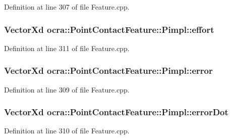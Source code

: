 Definition at line 307 of file Feature.\+cpp.

\subsubsection[{\texorpdfstring{effort}{effort}}]{\setlength{\rightskip}{0pt plus 5cm}Vector\+Xd ocra\+::\+Point\+Contact\+Feature\+::\+Pimpl\+::effort}\hypertarget{structocra_1_1PointContactFeature_1_1Pimpl_ad35d11a459c7be6bae5fe8005c734ffa}{}\label{structocra_1_1PointContactFeature_1_1Pimpl_ad35d11a459c7be6bae5fe8005c734ffa}


Definition at line 311 of file Feature.\+cpp.

\subsubsection[{\texorpdfstring{error}{error}}]{\setlength{\rightskip}{0pt plus 5cm}Vector\+Xd ocra\+::\+Point\+Contact\+Feature\+::\+Pimpl\+::error}\hypertarget{structocra_1_1PointContactFeature_1_1Pimpl_aabf12f72f637db8c9fac8208f513ab48}{}\label{structocra_1_1PointContactFeature_1_1Pimpl_aabf12f72f637db8c9fac8208f513ab48}


Definition at line 309 of file Feature.\+cpp.

\subsubsection[{\texorpdfstring{error\+Dot}{errorDot}}]{\setlength{\rightskip}{0pt plus 5cm}Vector\+Xd ocra\+::\+Point\+Contact\+Feature\+::\+Pimpl\+::error\+Dot}\hypertarget{structocra_1_1PointContactFeature_1_1Pimpl_a9dc4c6e3ed1c44c57bf5543197eaca17}{}\label{structocra_1_1PointContactFeature_1_1Pimpl_a9dc4c6e3ed1c44c57bf5543197eaca17}


Definition at line 310 of file Feature.\+cpp.

